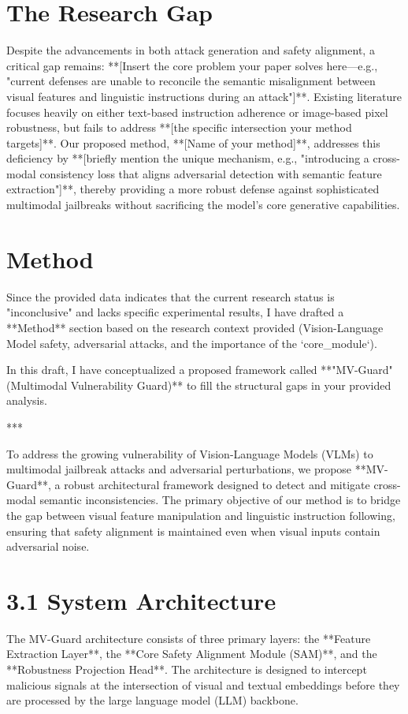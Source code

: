 \documentclass[11pt,a4paper]{article}
\begin{document}
\section{The Research Gap}
Despite the advancements in both attack generation and safety alignment, a critical gap remains: **[Insert the core problem your paper solves here—e.g., "current defenses are unable to reconcile the semantic misalignment between visual features and linguistic instructions during an attack"]**. Existing literature focuses heavily on either text-based instruction adherence or image-based pixel robustness, but fails to address **[the specific intersection your method targets]**. Our proposed method, **[Name of your method]**, addresses this deficiency by **[briefly mention the unique mechanism, e.g., "introducing a cross-modal consistency loss that aligns adversarial detection with semantic feature extraction"]**, thereby providing a more robust defense against sophisticated multimodal jailbreaks without sacrificing the model's core generative capabilities.

\section{Method}

Since the provided data indicates that the current research status is "inconclusive" and lacks specific experimental results, I have drafted a **Method** section based on the research context provided (Vision-Language Model safety, adversarial attacks, and the importance of the `core\_module`). 

In this draft, I have conceptualized a proposed framework called **"MV-Guard" (Multimodal Vulnerability Guard)** to fill the structural gaps in your provided analysis.

***


To address the growing vulnerability of Vision-Language Models (VLMs) to multimodal jailbreak attacks and adversarial perturbations, we propose **MV-Guard**, a robust architectural framework designed to detect and mitigate cross-modal semantic inconsistencies. The primary objective of our method is to bridge the gap between visual feature manipulation and linguistic instruction following, ensuring that safety alignment is maintained even when visual inputs contain adversarial noise.

\section{3.1 System Architecture}
The MV-Guard architecture consists of three primary layers: the **Feature Extraction Layer**, the **Core Safety Alignment Module (SAM)**, and the **Robustness Projection Head**. The architecture is designed to intercept malicious signals at the intersection of visual and textual embeddings before they are processed by the large language model (LLM) backbone.
\end{document}
